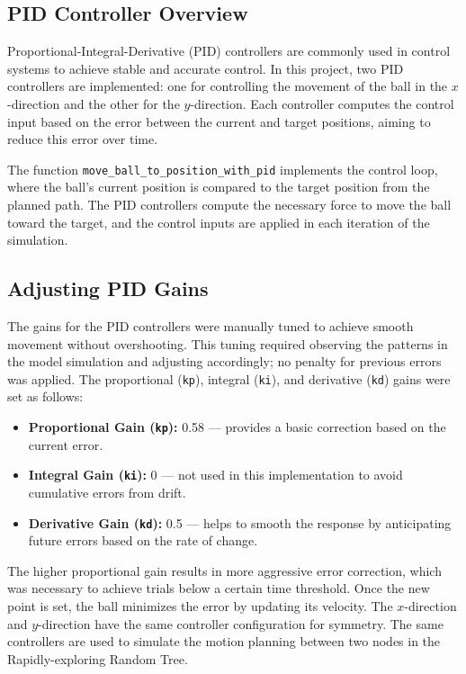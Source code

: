 \documentclass[12pt]{article}
\begin{document}
\subsection{PID Controller Overview}
Proportional-Integral-Derivative (PID) controllers are commonly used in control systems to achieve stable and accurate control. In this project, two PID controllers are implemented: one for controlling the movement of the ball in the \(x\)-direction and the other for the \(y\)-direction. Each controller computes the control input based on the error between the current and target positions, aiming to reduce this error over time.

The function \texttt{move\_ball\_to\_position\_with\_pid} implements the control loop, where the ball’s current position is compared to the target position from the planned path. The PID controllers compute the necessary force to move the ball toward the target, and the control inputs are applied in each iteration of the simulation.

\subsection{Adjusting PID Gains}
The gains for the PID controllers were manually tuned to achieve smooth movement without overshooting. This tuning required observing the patterns in the model simulation and adjusting accordingly; no penalty for previous errors was applied. The proportional (\texttt{kp}), integral (\texttt{ki}), and derivative (\texttt{kd}) gains were set as follows:
\begin{itemize}
    \item \textbf{Proportional Gain (\texttt{kp}):} 0.58 — provides a basic correction based on the current error.
    \item \textbf{Integral Gain (\texttt{ki}):} 0 — not used in this implementation to avoid cumulative errors from drift.
    \item \textbf{Derivative Gain (\texttt{kd}):} 0.5 — helps to smooth the response by anticipating future errors based on the rate of change.
\end{itemize}

The higher proportional gain results in more aggressive error correction, which was necessary to achieve trials below a certain time threshold. Once the new point is set, the ball minimizes the error by updating its velocity. The \(x\)-direction and \(y\)-direction have the same controller configuration for symmetry. The same controllers are used to simulate the motion planning between two nodes in the Rapidly-exploring Random Tree.
\end{document}
